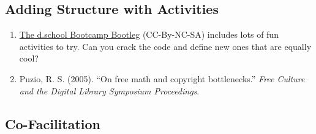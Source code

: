 \subsection{Adding Structure with
Activities}\label{rec:adding-structure-with-activities}

\begin{enumerate}
\def\labelenumi{\arabic{enumi}.}
\item
  \href{http://dschool.stanford.edu/wp-content/uploads/2011/03/BootcampBootleg2010v2SLIM.pdf}{The
  d.school Bootcamp Bootleg} (CC-By-NC-SA) includes lots of fun
  activities to try. Can you crack the code and define new ones that are
  equally cool?
\item
  Puzio, R. S. (2005). ``On free math and copyright bottlenecks.''
  \emph{Free Culture and the Digital Library Symposium Proceedings}.
\end{enumerate}

\subsection{Co-Facilitation}\label{rec:co-facilitation}

